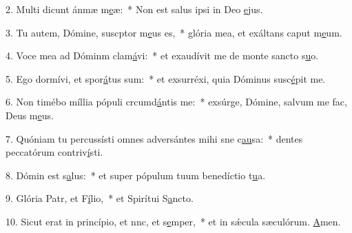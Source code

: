 2. Multi dicunt ánmæ m\uline{e}æ:~* Non est salus ipsi in Deo \uline{e}jus.\par 
3. Tu autem, Dómine, suscptor m\uline{e}us es,~* glória mea, et exáltans caput m\uline{e}um.\par 
4. Voce mea ad Dóminm clam\uline{á}vi:~* et exaudívit me de monte sancto s\uline{u}o.\par 
5. Ego dormívi, et spor\uline{á}tus sum:~* et exsurréxi, quia Dóminus susc\uline{é}pit me.\par 
6. Non timébo míllia pópuli crcumd\uline{á}ntis me:~* exsúrge, Dómine, salvum me fac, Deus m\uline{e}us.\par 
7. Quóniam tu percussísti omnes adversántes mihi sne c\uline{au}sa:~* dentes peccatórum contriv\uline{í}sti.\par 
8. Dómin est s\uline{a}lus:~* et super pópulum tuum benedíctio t\uline{u}a.\par 
9. Glória Patr, et F\uline{í}lio,~* et Spirítui S\uline{a}ncto.\par 
10. Sicut erat in princípio, et nnc, et s\uline{e}mper,~* et in sǽcula sæculórum. \uline{A}men.\par 
